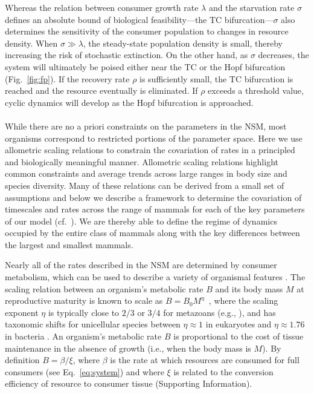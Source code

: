 \documentclass[11pt]{article}
\begin{document}
\begin{multicols}{2}
Whereas the relation between consumer growth rate $\lambda$ and the starvation rate $\sigma$ defines an absolute bound of biological feasibility---the TC bifurcation---$\sigma$ also determines the sensitivity of the consumer population to changes in resource density.  
When $\sigma\gg\lambda$, the steady-state population density is small, thereby increasing the risk of stochastic extinction.  
On the other hand, as $\sigma$ decreases, the system will ultimately be poised either near the TC or the Hopf bifurcation (Fig.~\ref{fig:fp}).  
If the recovery rate $\rho$ is sufficiently small, the TC bifurcation is reached and the resource eventually is eliminated.  
If $\rho$ exceeds a threshold value, cyclic dynamics will develop as the Hopf bifurcation is approached.
\\


 \\ 
While there are no a priori constraints on the parameters in the NSM, most
organisms correspond to restricted portions of the parameter space.  Here we
use allometric scaling relations to constrain the covariation of rates in a
principled and biologically meaningful manner.  Allometric scaling relations
highlight common constraints and average trends across large ranges in body
size and species diversity. Many of these relations can be derived from a
small set of assumptions and below we describe a framework to determine the
covariation of timescales and rates across the range of mammals for each of
the key parameters of our model (cf.~\cite{Yodzis:1992hg}).  We are thereby
able to define the regime of dynamics occupied by the entire class of mammals
along with the key differences between the largest and smallest mammals.


Nearly all of the rates described in the NSM are determined by consumer
metabolism, which can be used to describe a variety of organismal features
\cite{Brown:2004wq}.  The scaling relation between an organism's metabolic
rate $B$ and its body mass $M$ at reproductive maturity is known to scale as
$B = B_0 M^\eta$~\cite{West:2002it}, where the scaling exponent $\eta$ is
typically close to $2/3$ or $3/4$ for metazoans (e.g., \cite{Brown:2004wq}),
and has taxonomic shifts for unicellular species between $\eta\approx 1$ in
eukaryotes and $\eta\approx 1.76$ in bacteria
\cite{DeLong:2010dy,Kempes:2012hy}.
An organism's metabolic rate $B$ is proportional to the cost of tissue
maintenance in the absence of growth (i.e., when the body mass is $M$).  By
definition $B=\beta/\xi$, where $\beta$ is the rate at which resources are
consumed for full consumers (see Eq.~\eqref{eq:system}) and where $\xi$ is
related to the conversion efficiency of resource to consumer tissue
(Supporting Information).


\end{multicols}
\end{document}
